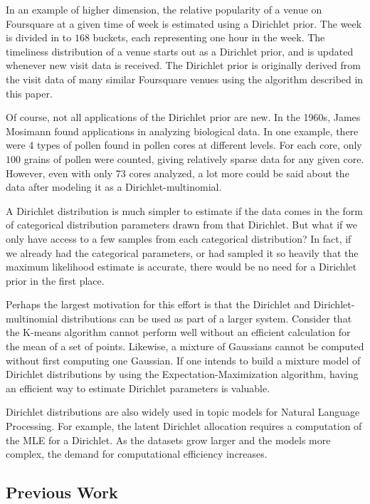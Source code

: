 \documentclass[twoside]{article}
\begin{document}
In an example of higher dimension, the relative popularity of a venue on Foursquare at a given time of week is estimated using a Dirichlet prior\cite{sklar}.  The week is divided in to $168$ buckets, each representing one hour in the week.  The timeliness distribution of a venue starts out as a Dirichlet prior, and is updated whenever new visit data is received. The Dirichlet prior is originally derived from the visit data of many similar Foursquare venues using the algorithm described in this paper.

Of course, not all applications of the Dirichlet prior are new.  In the 1960s, James Mosimann found applications in analyzing biological data\cite{mosimann}.  In one example, there were 4 types of pollen found in pollen cores at different levels.  For each core, only $100$ grains of pollen were counted, giving relatively sparse data for any given core.  However, even with only 73 cores analyzed, a lot more could be said about the data after modeling it as a Dirichlet-multinomial\cite[pg 8]{ng}\cite{mosimann}.

A Dirichlet distribution is much simpler to estimate if the data comes in the form of categorical distribution parameters drawn from that Dirichlet. But what if we only have access to a few samples from each categorical distribution?  In fact, if we already had the categorical parameters, or had sampled it so heavily that the maximum likelihood estimate is accurate, there would be no need for a Dirichlet prior in the first place.

Perhaps the largest motivation for this effort is that the Dirichlet and Dirichlet-multinomial distributions can be used as part of a larger system. Consider that the K-means algorithm cannot perform well without an efficient calculation for the mean of a set of points. Likewise, a mixture of Gaussians cannot be computed without first computing one Gaussian.  If one intends to build a mixture model of Dirichlet distributions by using the Expectation-Maximization algorithm, having an efficient way to estimate Dirichlet parameters is valuable.

Dirichlet distributions are also widely used in topic models for Natural Language Processing.  For example, the latent Dirichlet allocation requires a computation of the MLE for a Dirichlet\cite{blei}\cite{heinrich}\cite{wallach}.  As the datasets grow larger and the models more complex, the demand for computational efficiency increases.  

\subsection{Previous Work}
\end{document}
